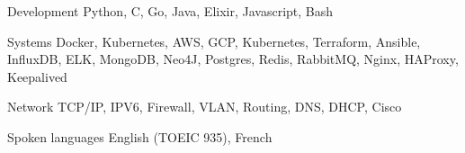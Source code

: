 


\begin{cvskills}


\cvskill
{Development} %
{Python, C, Go, Java, Elixir, Javascript, Bash} %




\cvskill
{Systems} %
{Docker, Kubernetes, AWS, GCP, Kubernetes, Terraform, Ansible, InfluxDB,\break
ELK, MongoDB, Neo4J, Postgres, Redis, RabbitMQ, Nginx, HAProxy, Keepalived} %



\cvskill
{Network} %
{TCP/IP, IPV6, Firewall, VLAN, Routing, DNS, DHCP, Cisco} %





\cvskill
{Spoken languages} %
{English (TOEIC 935), French} %


\end{cvskills}